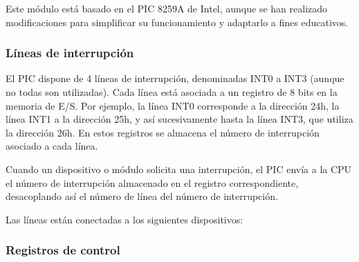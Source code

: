 \documentclass[12pt,oneside]{templates/unerthesis}
\begin{document}
Este módulo está basado en el PIC 8259A de Intel, aunque se han realizado modificaciones para simplificar su funcionamiento y adaptarlo a fines educativos.

\hypertarget{luxedneas-de-interrupciuxf3n}{%
\subsubsection{Líneas de interrupción}\label{luxedneas-de-interrupciuxf3n}}

El PIC dispone de 4 líneas de interrupción, denominadas INT0 a INT3 (aunque no todas son utilizadas). Cada línea está asociada a un registro de 8 bits en la memoria de E/S. Por ejemplo, la línea INT0 corresponde a la dirección 24h, la línea INT1 a la dirección 25h, y así sucesivamente hasta la línea INT3, que utiliza la dirección 26h. En estos registros se almacena el número de interrupción asociado a cada línea.

Cuando un dispositivo o módulo solicita una interrupción, el PIC envía a la CPU el número de interrupción almacenado en el registro correspondiente, desacoplando así el número de línea del número de interrupción.

Las líneas están conectadas a los siguientes dispositivos:

\begin{table}[!h]
\centering
\caption{\label{tab:tPIC}Líneas de interrupción y dispositivos asociados}
\centering
{}
\end{table}

\hypertarget{registros-de-control}{%
\subsubsection{Registros de control}\label{registros-de-control}}
\end{document}
